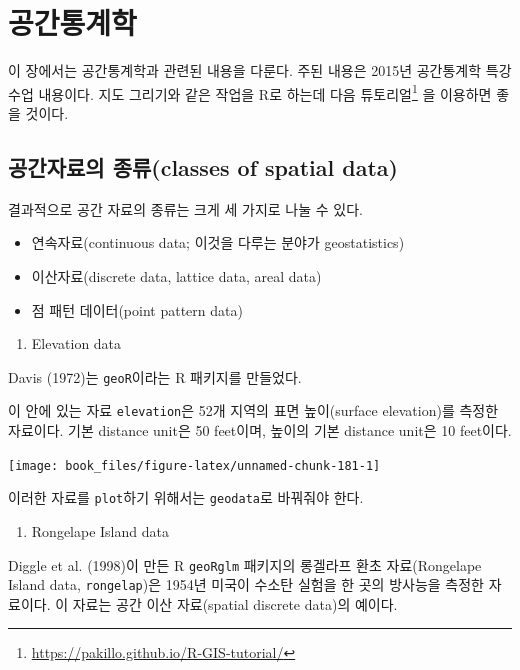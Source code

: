 \documentclass[b5paper,]{scrbook}
\providecommand{\tightlist}{%
  \setlength{\itemsep}{0pt}\setlength{\parskip}{0pt}}
\theoremstyle{plain}
\theoremstyle{definition}
\numberwithin{equation}{section}
\renewcommand{\href}[2]{#2\footnote{\url{#1}}}
\begin{document}
\chapter{공간통계학}\label{spatial}

이 장에서는 공간통계학과 관련된 내용을 다룬다. 주된 내용은 2015년
공간통계학 특강 수업 내용이다. 지도 그리기와 같은 작업을 R로 하는데
\href{https://pakillo.github.io/R-GIS-tutorial/}{다음 튜토리얼} 을
이용하면 좋을 것이다.

\section{공간자료의 종류(classes of spatial
data)}\label{-classes-of-spatial-data}

결과적으로 공간 자료의 종류는 크게 세 가지로 나눌 수 있다.

\begin{itemize}
\item
  연속자료(continuous data; 이것을 다루는 분야가 geostatistics)
\item
  이산자료(discrete data, lattice data, areal data)
\item
  점 패턴 데이터(point pattern data)
\end{itemize}

\begin{enumerate}
\def\labelenumi{\arabic{enumi}.}
\tightlist
\item
  Elevation data
\end{enumerate}

Davis (1972)는 \texttt{geoR}이라는 R 패키지를 만들었다.

이 안에 있는 자료 \texttt{elevation}은 52개 지역의 표면 높이(surface
elevation)를 측정한 자료이다. 기본 distance unit은 50 feet이며, 높이의
기본 distance unit은 10 feet이다.

\begin{center}\texttt{[image: book\_files/figure-latex/unnamed-chunk-181-1]} \end{center}

이러한 자료를 \texttt{plot}하기 위해서는 \texttt{geodata}로 바꿔줘야
한다.

\begin{enumerate}
\def\labelenumi{\arabic{enumi}.}
\setcounter{enumi}{1}
\tightlist
\item
  Rongelape Island data
\end{enumerate}

Diggle et al. (1998)이 만든 R \texttt{geoRglm} 패키지의 롱겔라프 환초
자료(Rongelape Island data, \texttt{rongelap})은 1954년 미국이 수소탄
실험을 한 곳의 방사능을 측정한 자료이다. 이 자료는 공간 이산
자료(spatial discrete data)의 예이다.
\end{document}
